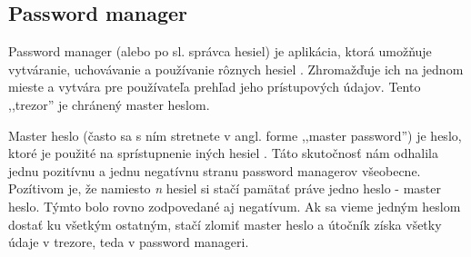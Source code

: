 \subsection{Password manager}
Password manager (alebo po sl. správca hesiel) je aplikácia, ktorá umožňuje vytváranie, uchovávanie a používanie rôznych hesiel \cite{sprava_hesiel}. Zhromažďuje ich na jednom mieste a vytvára pre používateľa prehľad jeho prístupových údajov. Tento ,,trezor'' je chránený master heslom.

Master heslo (často sa s ním stretnete v angl. forme ,,master password'') je heslo, ktoré je použité na sprístupnenie iných hesiel \cite{master_password}. Táto skutočnosť nám odhalila jednu pozitívnu a jednu negatívnu stranu password managerov všeobecne. Pozítivom je, že namiesto \textit{n} hesiel si stačí pamätať práve jedno heslo - master heslo. Týmto bolo rovno zodpovedané aj negatívum. Ak sa vieme jedným heslom dostať ku všetkým ostatným, stačí zlomiť master heslo a útočník získa všetky údaje v trezore, teda v password manageri.